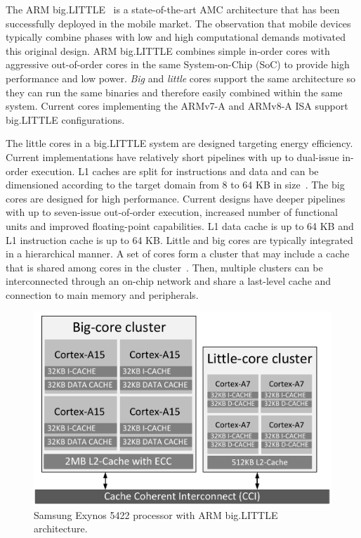 The ARM big.LITTLE~\cite{samsung, Greenhalgh2011} is a state-of-the-art AMC architecture that has been successfully deployed in the mobile market. The observation that mobile devices typically combine phases with low and high computational demands motivated this original design. ARM big.LITTLE combines simple in-order cores with aggressive out-of-order cores in the same System-on-Chip (SoC) to provide high performance and low power. \textit{Big} and \textit{little} cores support the same architecture so they can run the same binaries and therefore easily combined within the same system.
% 
Current cores implementing the ARMv7-A and ARMv8-A ISA support big.LIT\-TLE configurations. 

The little cores in a big.LITTLE system are designed targeting energy efficiency. Current implementations have relatively short pipelines with up to dual-issue in-order execution. L1 caches are split for instructions and data and can be dimensioned according to the target domain from 8 to 64 KB in size~\cite{MPR_A53}. The big cores are designed for high performance. Current designs
have deeper pipelines with up to seven-issue out-of-order execution, increased number of functional units and improved floating-point capabilities. L1 data cache is up to 64 KB and L1 instruction cache is up to 64 KB\cite{MPR_A57, MPR_A72,GWENAPP}. Little and big cores are typically integrated in a hierarchical manner. A set of cores form a cluster that may include a cache that is shared among cores in the cluster~\cite{GWENAPP}. Then, multiple clusters can be interconnected through an on-chip network and share a last-level cache and connection to main memory and peripherals.

\begin{figure}[t]
        \centering
        \includegraphics[width=\columnwidth]{figures/block_diagram.pdf}%
        \caption{Samsung Exynos 5422 processor with ARM big.LITTLE architecture.}%
        \label{fig:big-little-diagram}%
        \vspace{-0.56cm}
\end{figure}

